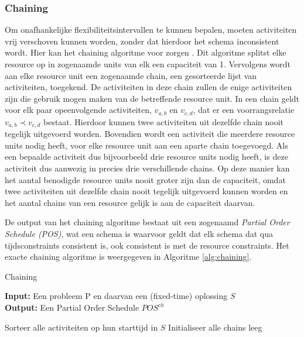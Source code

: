 \subsubsection{Chaining}
\label{subsubsec:chainingoplossing}
Om onafhankelijke flexibiliteitsintervallen te kunnen bepalen, moeten activiteiten vrij verschoven kunnen worden, zonder dat hierdoor het schema inconsistent wordt. Hier kan het chaining algoritme voor zorgen \cite{policella2007precedence}. Dit algoritme splitst elke resource op in zogenaamde units van elk een capaciteit van 1. Vervolgens wordt aan elke resource unit een zogenaamde chain, een gesorteerde lijst van activiteiten, toegekend. De activiteiten in deze chain zullen de enige activiteiten zijn die gebruik mogen maken van de betreffende resource unit. In een chain geldt voor elk paar opeenvolgende activiteiten, $v_{a,b}$ en $v_{c,d}$, dat er een voorrangsrelatie $v_{a,b} \prec v_{c,d}$ bestaat. Hierdoor kunnen twee activiteiten uit dezelfde chain nooit tegelijk uitgevoerd worden. Bovendien wordt een activiteit die meerdere resource units nodig heeft, voor elke resource unit aan een aparte chain toegevoegd. Als een bepaalde activiteit dus bijvoorbeeld drie resource units nodig heeft, is deze activiteit dus aanwezig in precies drie verschillende chains. Op deze manier kan het aantal benodigde resource units nooit groter zijn dan de capaciteit, omdat twee activiteiten uit dezelfde chain nooit tegelijk uitgevoerd kunnen worden en het aantal chains van een resource gelijk is aan de capaciteit daarvan.

De output van het chaining algoritme bestaat uit een zogenaamd \emph{Partial Order Schedule (POS)}, wat een schema is waarvoor geldt dat elk schema dat qua tijdsconstraints consistent is, ook consistent is met de resource constraints. Het exacte chaining algoritme is weergegeven in Algoritme \ref{alg:chaining}.

\begin{algorithm}
\caption{Chaining \cite{policella2007precedence}}
\label{alg:chaining}
\textbf{Input:} Een probleem P en daarvan een (fixed-time) oplossing $S$ \\
\textbf{Output:} Een Partial Order Schedule $POS^{ch}$
\begin{algorithmic}[1]
    \State Sorteer alle activiteiten op hun starttijd in $S$  
    \State Initialiseer alle chains leeg
        \EndFor
      \EndFor
    \EndFor
  \EndFunction
\end{algorithmic}
\end{algorithm}

